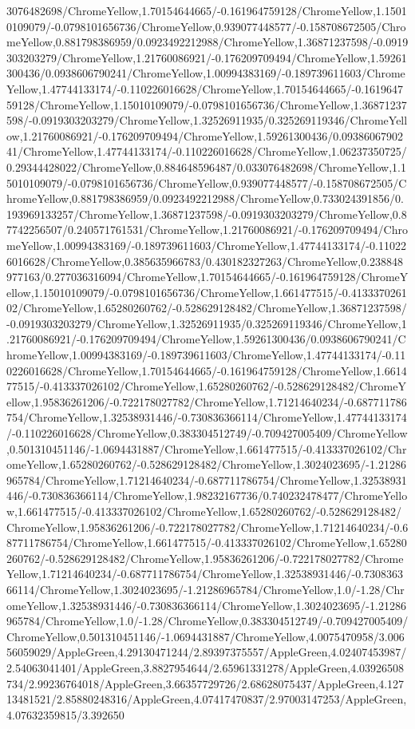 {\begin{tikzternal}
3076482698/ChromeYellow,1.70154644665/-0.161964759128/ChromeYellow,1.15010109079/-0.0798101656736/ChromeYellow,0.939077448577/-0.158708672505/ChromeYellow,0.881798386959/0.0923492212988/ChromeYellow,1.36871237598/-0.0919303203279/ChromeYellow,1.21760086921/-0.176209709494/ChromeYellow,1.59261300436/0.0938606790241/ChromeYellow,1.00994383169/-0.189739611603/ChromeYellow,1.47744133174/-0.110226016628/ChromeYellow,1.70154644665/-0.161964759128/ChromeYellow,1.15010109079/-0.0798101656736/ChromeYellow,1.36871237598/-0.0919303203279/ChromeYellow,1.32526911935/0.325269119346/ChromeYellow,1.21760086921/-0.176209709494/ChromeYellow,1.59261300436/0.0938606790241/ChromeYellow,1.47744133174/-0.110226016628/ChromeYellow,1.06237350725/0.29344428022/ChromeYellow,0.884648596487/0.033076482698/ChromeYellow,1.15010109079/-0.0798101656736/ChromeYellow,0.939077448577/-0.158708672505/ChromeYellow,0.881798386959/0.0923492212988/ChromeYellow,0.733024391856/0.193969133257/ChromeYellow,1.36871237598/-0.0919303203279/ChromeYellow,0.87742256507/0.240571761531/ChromeYellow,1.21760086921/-0.176209709494/ChromeYellow,1.00994383169/-0.189739611603/ChromeYellow,1.47744133174/-0.110226016628/ChromeYellow,0.385635966783/0.430182327263/ChromeYellow,0.238848977163/0.277036316094/ChromeYellow,1.70154644665/-0.161964759128/ChromeYellow,1.15010109079/-0.0798101656736/ChromeYellow,1.661477515/-0.413337026102/ChromeYellow,1.65280260762/-0.528629128482/ChromeYellow,1.36871237598/-0.0919303203279/ChromeYellow,1.32526911935/0.325269119346/ChromeYellow,1.21760086921/-0.176209709494/ChromeYellow,1.59261300436/0.0938606790241/ChromeYellow,1.00994383169/-0.189739611603/ChromeYellow,1.47744133174/-0.110226016628/ChromeYellow,1.70154644665/-0.161964759128/ChromeYellow,1.661477515/-0.413337026102/ChromeYellow,1.65280260762/-0.528629128482/ChromeYellow,1.95836261206/-0.722178027782/ChromeYellow,1.71214640234/-0.687711786754/ChromeYellow,1.32538931446/-0.730836366114/ChromeYellow,1.47744133174/-0.110226016628/ChromeYellow,0.383304512749/-0.709427005409/ChromeYellow,0.501310451146/-1.0694431887/ChromeYellow,1.661477515/-0.413337026102/ChromeYellow,1.65280260762/-0.528629128482/ChromeYellow,1.3024023695/-1.21286965784/ChromeYellow,1.71214640234/-0.687711786754/ChromeYellow,1.32538931446/-0.730836366114/ChromeYellow,1.98232167736/0.740232478477/ChromeYellow,1.661477515/-0.413337026102/ChromeYellow,1.65280260762/-0.528629128482/ChromeYellow,1.95836261206/-0.722178027782/ChromeYellow,1.71214640234/-0.687711786754/ChromeYellow,1.661477515/-0.413337026102/ChromeYellow,1.65280260762/-0.528629128482/ChromeYellow,1.95836261206/-0.722178027782/ChromeYellow,1.71214640234/-0.687711786754/ChromeYellow,1.32538931446/-0.730836366114/ChromeYellow,1.3024023695/-1.21286965784/ChromeYellow,1.0/-1.28/ChromeYellow,1.32538931446/-0.730836366114/ChromeYellow,1.3024023695/-1.21286965784/ChromeYellow,1.0/-1.28/ChromeYellow,0.383304512749/-0.709427005409/ChromeYellow,0.501310451146/-1.0694431887/ChromeYellow,4.0075470958/3.00656059029/AppleGreen,4.29130471244/2.89397375557/AppleGreen,4.02407453987/2.54063041401/AppleGreen,3.8827954644/2.65961331278/AppleGreen,4.03926508734/2.99236764018/AppleGreen,3.66357729726/2.68628075437/AppleGreen,4.12713481521/2.85880248316/AppleGreen,4.07417470837/2.97003147253/AppleGreen,4.07632359815/3.392650
\end{tikzternal}}
